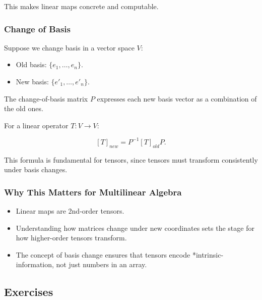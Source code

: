 \documentclass[
  letterpaper,
  DIV=11,
  numbers=noendperiod]{scrreprt}
\providecommand{\tightlist}{%
  \setlength{\itemsep}{0pt}\setlength{\parskip}{0pt}}
\begin{document}
This makes linear maps concrete and computable.

\subsubsection{Change of Basis}\label{change-of-basis}

Suppose we change basis in a vector space \(V\):

\begin{itemize}
\tightlist
\item
  Old basis: \(\{e_1, \dots, e_n\}\).
\item
  New basis: \(\{e'_1, \dots, e'_n\}\).
\end{itemize}

The change-of-basis matrix \(P\) expresses each new basis vector as a
combination of the old ones.

For a linear operator \(T: V \to V\):

\[
[T]_{new} = P^{-1} [T]_{old} P.
\]

This formula is fundamental for tensors, since tensors must transform
consistently under basis changes.

\subsubsection{Why This Matters for Multilinear
Algebra}\label{why-this-matters-for-multilinear-algebra-1}

\begin{itemize}
\tightlist
\item
  Linear maps are 2nd-order tensors.
\item
  Understanding how matrices change under new coordinates sets the stage
  for how higher-order tensors transform.
\item
  The concept of basis change ensures that tensors encode *intrinsic-
  information, not just numbers in an array.
\end{itemize}

\subsection{Exercises}\label{exercises-5}
\end{document}
